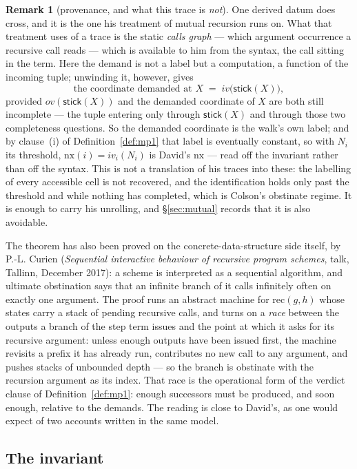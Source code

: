 \documentclass[11pt]{article}
\newcommand{\ovv}{\mathit{ov}}
\newcommand{\ivv}{\mathit{iv}}
\newcommand{\stick}{\mathsf{stick}}
\theoremstyle{definition}
\newtheorem{remark}{Remark}
\begin{document}
\begin{remark}[provenance, and what this trace is \emph{not}]
One derived datum does cross, and it is the one his treatment of mutual
recursion runs on. What that treatment uses of a trace is the static
\emph{calls graph} --- which argument occurrence a recursive call reads
--- which is available to him from the syntax, the call sitting in the
term. Here the demand is not a label but a computation, a function of the
incoming tuple; unwinding it, however, gives
\[
\text{the coordinate demanded at } X \;=\; \ivv\bigl(\stick(X)\bigr),
\]
provided $\ovv(\stick(X))$ and the demanded coordinate of $X$ are both
still incomplete --- the tuple entering only through $\stick(X)$ and
through those two completeness questions. So the demanded coordinate is
the walk's own label; and by clause~(i) of Definition~\ref{def:mp1} that
label is eventually constant, so with $N_i$ its threshold,
$\mathrm{nx}(i) = \ivv_i(N_i)$ is David's $\mathrm{nx}$ --- read off the
invariant rather than off the syntax. This is not a translation of his
traces into these: the labelling of every accessible cell is not
recovered, and the identification holds only past the threshold and while
nothing has completed, which is Colson's obstinate regime. It is enough to
carry his unrolling, and \S\ref{sec:mutual} records that it is also
avoidable.

The theorem has also been proved on the concrete-data-structure side
itself, by P.-L. Curien (\emph{Sequential interactive behaviour of
recursive program schemes}, talk, Tallinn, December 2017): a scheme is
interpreted as a sequential algorithm, and ultimate obstination says that
an infinite branch of it calls infinitely often on exactly one argument.
The proof runs an abstract machine for $\mathrm{rec}(g,h)$ whose states
carry a stack of pending recursive calls, and turns on a \emph{race}
between the outputs a branch of the step term issues and the point at
which it asks for its recursive argument: unless enough outputs have been
issued first, the machine revisits a prefix it has already run, contributes
no new call to any argument, and pushes stacks of unbounded depth --- so
the branch is obstinate with the recursion argument as its index. That
race is the operational form of the verdict clause of
Definition~\ref{def:mp1}: enough successors must be produced, and soon
enough, relative to the demands. The reading is close to David's, as one
would expect of two accounts written in the same model.
\end{remark}

\subsection{The invariant}
\end{document}
